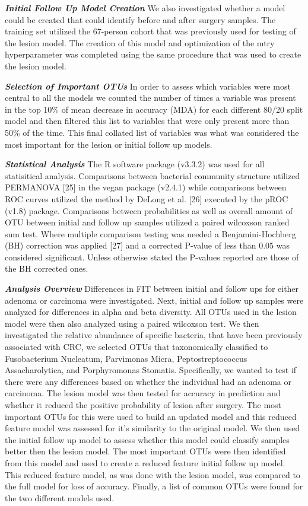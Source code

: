 \documentclass[12pt,]{article}
\begin{document}
\textbf{\emph{Initial Follow Up Model Creation}} We also investigated
whether a model could be created that could identify before and after
surgery samples. The training set utilized the 67-person cohort that was
previously used for testing of the lesion model. The creation of this
model and optimization of the mtry hyperparameter was completed using
the same procedure that was used to create the lesion model.

\textbf{\emph{Selection of Important OTUs}} In order to assess which
variables were most central to all the models we counted the number of
times a variable was present in the top 10\% of mean decrease in
accuracy (MDA) for each different 80/20 split model and then filtered
this list to variables that were only present more than 50\% of the
time. This final collated list of variables was what was considered the
most important for the lesion or initial follow up models.

\textbf{\emph{Statistical Analysis}} The R software package (v3.3.2) was
used for all statisitical analysis. Comparisons between bacterial
community structure utilized PERMANOVA {[}25{]} in the vegan package
(v2.4.1) while comparisons between ROC curves utilized the method by
DeLong et al. {[}26{]} executed by the pROC (v1.8) package. Comparisons
between probabilities as well as overall amount of OTU between initial
and follow up samples utilized a paired wilcoxson ranked sum test. Where
multiple comparison testing was needed a Benjamini-Hochberg (BH)
correction was applied {[}27{]} and a corrected P-value of less than
0.05 was considered significant. Unless otherwise stated the P-values
reported are those of the BH corrected ones.

\textbf{\emph{Analysis Overview}} Differences in FIT between initial and
follow ups for either adenoma or carcinoma were investigated. Next,
initial and follow up samples were analyzed for differences in alpha and
beta diversity. All OTUs used in the lesion model were then also
analyzed using a paired wilcoxson test. We then investigated the
relative abundance of specific bacteria, that have been previously
associated with CRC, we selected OTUs that taxonomically classified to
Fusobacterium Nucleatum, Parvimonas Micra, Peptostreptococcus
Assacharolytica, and Porphyromonas Stomatis. Specifically, we wanted to
test if there were any differences based on whether the individual had
an adenoma or carcinoma. The lesion model was then tested for accuracy
in prediction and whether it reduced the positive probability of lesion
after surgery. The most important OTUs for this were used to build an
updated model and this reduced feature model was assessed for it's
similarity to the original model. We then used the initial follow up
model to assess whether this model could classify samples better then
the lesion model. The most important OTUs were then identified from this
model and used to create a reduced feature initial follow up model. This
reduced feature model, as was done with the lesion model, was compared
to the full model for loss of accuracy. Finally, a list of common OTUs
were found for the two different models used.
\end{document}
